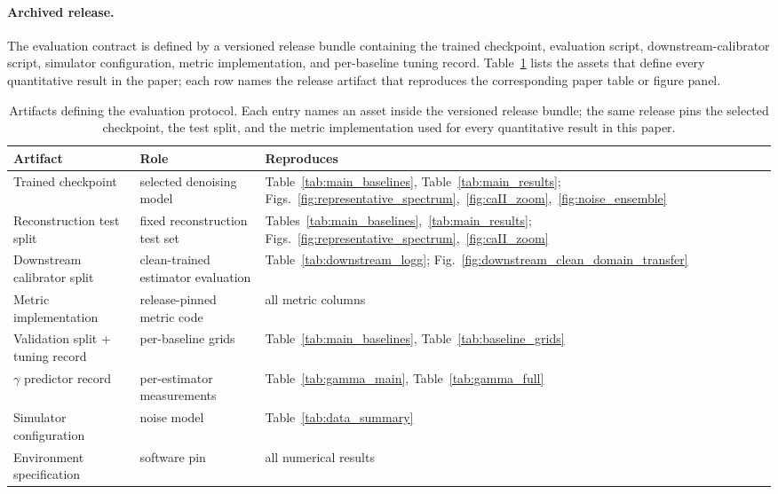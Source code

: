 \documentclass[twocolumn]{aastex7}
\newcounter{protocol}
\begin{document}
\paragraph{Archived release.}
The evaluation contract is defined by a versioned release bundle containing the trained checkpoint, evaluation script, downstream-calibrator script, simulator configuration, metric implementation, and per-baseline tuning record. Table~\ref{tab:contract_artifacts} lists the assets that define every quantitative result in the paper; each row names the release artifact that reproduces the corresponding paper table or figure panel.

\begin{table}[ht]
\centering
\small
\setlength{\tabcolsep}{4pt}
\caption{Artifacts defining the evaluation protocol. Each entry names an asset inside the versioned release bundle; the same release pins the selected checkpoint, the test split, and the metric implementation used for every quantitative result in this paper.}
\label{tab:contract_artifacts}
\begin{tabular}{lll}
\hline
Artifact & Role & Reproduces \\
\hline
Trained checkpoint & selected denoising model & Table~\ref{tab:main_baselines}, Table~\ref{tab:main_results}; Figs.~\ref{fig:representative_spectrum},~\ref{fig:caII_zoom},~\ref{fig:noise_ensemble} \\
Reconstruction test split & fixed reconstruction test set & Tables~\ref{tab:main_baselines},~\ref{tab:main_results}; Figs.~\ref{fig:representative_spectrum},~\ref{fig:caII_zoom} \\
Downstream calibrator split & clean-trained estimator evaluation & Table~\ref{tab:downstream_logg}; Fig.~\ref{fig:downstream_clean_domain_transfer} \\
Metric implementation & release-pinned metric code & all metric columns \\
Validation split + tuning record & per-baseline grids & Table~\ref{tab:main_baselines}, Table~\ref{tab:baseline_grids} \\
$\gamma$ predictor record & per-estimator measurements & Table~\ref{tab:gamma_main}, Table~\ref{tab:gamma_full} \\
Simulator configuration & noise model & Table~\ref{tab:data_summary} \\
Environment specification & software pin & all numerical results \\
\hline
\end{tabular}
\end{table}
\end{document}
